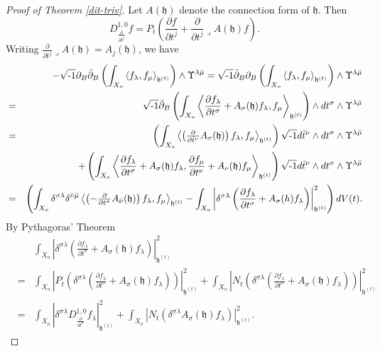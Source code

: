 \documentclass[12pt,hidelinks]{amsart}
\newcommand{\fh}{{\mathfrak h}}
\newcommand{\di}{\partial}
\newcommand{\dbar}{\bar \partial}
\newcommand{\ii}{\sqrt{\text{\rm -}1}}
\begin{document}
\begin{proof}[Proof of Theorem \ref{dit-triv}]
Let $A(\fh)$ denote the connection form of $\fh$.  Then
\[
D^{1,0}_{\frac{\di}{\di t ^j}} f =  P_{t} \left ( \frac{\di f }{\di t ^j} + \frac{\di}{\di t ^j} \lrcorner A(\fh)  f \right ).
\]
Writing $\frac{\di}{\di t ^j} \lrcorner A(\fh)  = A_j (\fh)$, we have
\begin{eqnarray*}
&& - \ii \di _{B}\dbar _{B} \left ( \int _{X_o}\left < f_{\lambda} , f_{\mu}\right >_{\fh^{(t)}}\right ) \wedge \Upsilon ^{\lambda \bar \mu} = \ii \dbar _{B} \di _{B}  \left ( \int _{X_o} \left < f_{\lambda} , f_{\mu}\right >_{\fh^{(t)}} \right ) \wedge \Upsilon ^{\lambda \bar \mu} \\
&=& \ii \dbar _{B} \left (\int _{X_o} \left <\frac{\di f_{\lambda}}{\di t^{\sigma}} + A_{\sigma} (\fh) f_{\lambda}, f_{\mu} \right >_{\fh^{(t)}}\right ) \wedge d t^{\sigma} \wedge \Upsilon^{\lambda \bar \mu}\\
&=& \left (\int _{X_o} \left < \left (\tfrac{\di}{\di \bar t ^{\nu}} A_{\sigma} (\fh) \right )f_{\lambda} , f_{\mu}\right >_{\fh^{(t)}} \right ) \ii d\bar t ^{\nu} \wedge dt ^{\sigma} \wedge \Upsilon^{\lambda \bar \mu}\\
&& \qquad  +\left (\int _{X_o} \left < \frac{\di f_{\lambda}}{\di t  ^{\sigma}} + A_{\sigma} (\fh) f_{\lambda},  \frac{\di f_{\mu} }{\di t ^{\nu}} + A_{\nu}(\fh) f_{\mu}\right >_{\fh^{(t)}}\right ) \ii d\bar t ^{\nu} \wedge dt^{\sigma} \wedge \Upsilon^{\lambda \bar \mu}\\
&=&   \left (\int _{X_o} \delta ^{\sigma \lambda} \delta ^{\bar \nu \bar \mu} \left < \left (-\tfrac{\di}{\di t ^{\sigma}} A_{\bar \nu} (\fh) \right ) f_{\lambda} , f_{\mu} \right >_{\fh^{(t)}} - \int _{X_o} \left |\delta^{\sigma \lambda} \left ( \frac{\di f_{\lambda}}{\di t  ^{\sigma}} + A_{\sigma} (h) f_{\lambda}\right ) \right |^2_{\fh^{(t)}} \right ) dV(t).
\end{eqnarray*}
By Pythagoras' Theorem 
\begin{eqnarray*}
&& \int _{X_o}\left  |\delta^{\sigma \lambda} \left ( \frac{\di f_{\lambda}}{\di t  ^{\sigma}} + A_{\sigma} (\fh) f_{\lambda}\right ) \right |^2_{\fh^{(t)}} \\
&=&  \int _{X_o}\left  |P_{t } \left ( \delta^{\sigma \lambda} \left ( \frac{\di f_{\lambda}}{\di t  ^{\sigma}} + A_{\sigma} (\fh) f_{\lambda}\right ) \right )\right |^2_{\fh^{(t)}}  +  \int _{X_o}\left  |N_{t } \left ( \delta^{\sigma \lambda} \left ( \frac{\di f_{\lambda}}{\di t  ^{\sigma}} + A_{\sigma} (\fh) f_{\lambda}\right ) \right )\right |^2_{\fh^{(t)}} \\
&=&  \int _{X_o}\left  |\delta ^{\sigma \lambda} D^{1,0} _{\frac{\di}{\di t  ^{\sigma}}} f_{\lambda}\right |^2_{\fh^{(t)}}  +  \int _{X_o}\left  |N_{t } \left ( \delta^{\sigma \lambda} A_{\sigma} (\fh) f_{\lambda}\right ) \right |^2_{\fh^{(t)}}.

\end{eqnarray*}
\end{proof}
\end{document}
